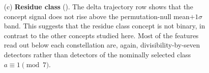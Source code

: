 \begin{figure}[p]
{ \label{fig:concept_overview_gcd}

\medskip
\noindent(c) \textbf{Residue class} (). The
delta trajectory row shows that the concept signal does not rise 
above the permutation-null
mean$+1\sigma$ band. This suggests that the residue class concept 
is not binary, in contrast
to the other concepts studied here. Most of the
features read out below each constellation are, again, divisibility-by-seven
detectors rather than detectors of the nominally selected class
$a\equiv 1\pmod 7$.
\label{fig:concept_overview_residue}
}
\end{figure}